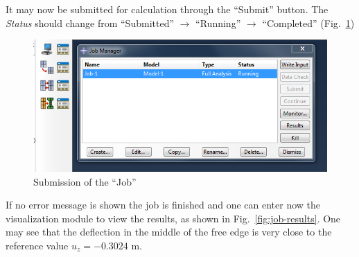\documentclass[english,a4paper,12pt]{article}
\begin{document}
It may now be submitted for calculation through the ``Submit'' button. The \emph{Status} should change from ``Submitted'' $\to$ ``Running'' $\to$ ``Completed''  (Fig.~\ref{fig:job-submit})
\begin{figure}[h!tp]
\centering
\includegraphics[scale=0.5]{capturas/38-job.png}
\caption{Submission of the ``Job''}
\label{fig:job-submit}
\end{figure}
If no error message is shown the job is finished and one can enter now the visualization module to view the results, as shown in Fig.~\ref{fig:job-results}.
One may see that the deflection in the middle of the free edge is very close to the reference value $u_{z}=-0.3024$ m.
\end{document}
